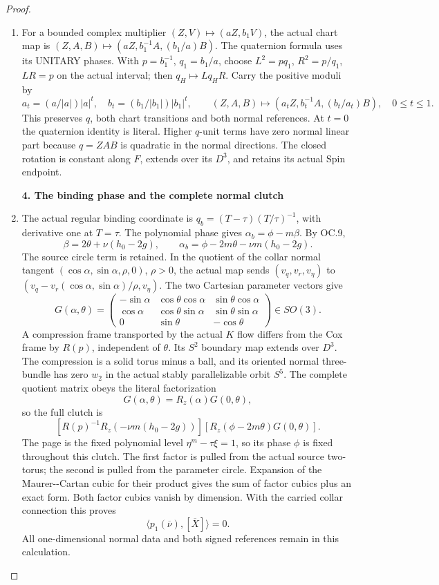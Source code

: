 \begin{proof}
\begin{enumerate}[label=\arabic*.]
\item For a bounded complex multiplier \((Z,V)\mapsto(aZ,b_1V)\), the
actual chart map is
\((Z,A,B)\mapsto(aZ,b_1^{-1}A,(b_1/a)B)\). The quaternion formula
uses its UNITARY phases. With \(p=b_1^{-1}\), \(q_1=b_1/a\), choose
\(L^2=pq_1\), \(R^2=p/q_1\), \(LR=p\) on the actual interval;
then \(q_H\mapsto Lq_HR\). Carry the positive moduli by
\[
a_t=(a/|a|)|a|^t,\quad b_t=(b_1/|b_1|)|b_1|^t,\qquad
(Z,A,B)\mapsto(a_tZ,b_t^{-1}A,(b_t/a_t)B),\quad0\le t\le1.
\tag{OC.15}
\]
This preserves \(q\), both chart transitions and both normal
references. At \(t=0\) the quaternion identity is literal. Higher
\(q\)-unit terms have zero normal linear part because \(q=ZAB\)
is quadratic in the normal directions. The closed rotation is
constant along \(F\), extends over its \(D^3\), and retains its
actual Spin endpoint.

\par

\medskip\noindent\textbf{4. The binding phase and the complete normal clutch}

\par\nobreak

\item The actual regular binding coordinate is
\(q_b=(T-\tau)(T/\tau)^{-1}\), with derivative one at \(T=\tau\).
The polynomial phase gives \(\alpha_b=\phi-m\beta\). By OC.9,
\[
\beta=2\theta+\nu(h_0-2g),\qquad
\alpha_b=\phi-2m\theta-\nu m(h_0-2g).
\tag{OC.16}
\]
The source circle term is retained. In the quotient of the collar
normal tangent \((\cos\alpha,\sin\alpha,\rho,0)\), \(\rho>0\),
the actual map sends
\((v_q,v_r,v_\eta)\) to
\((v_q-v_r(\cos\alpha,\sin\alpha)/\rho,v_\eta)\).
The two Cartesian parameter vectors give
\[
G(\alpha,\theta)=\begin{pmatrix}
-\sin\alpha&\cos\theta\cos\alpha&\sin\theta\cos\alpha\\
\cos\alpha&\cos\theta\sin\alpha&\sin\theta\sin\alpha\\
0&\sin\theta&-\cos\theta
\end{pmatrix}\in SO(3).
\tag{OC.17}
\]
A compression frame transported by the actual \(K\) flow differs
from the Cox frame by \(R(p)\), independent of \(\theta\). Its
\(S^2\) boundary map extends over \(D^3\). The compression is a
solid torus minus a ball, and its oriented normal three-bundle has
zero \(w_2\) in the actual stably parallelizable orbit \(S^5\).
The complete quotient matrix obeys the literal factorization
\[
G(\alpha,\theta)=R_z(\alpha)G(0,\theta),
\tag{OC.18}
\]
so the full clutch is
\[
[R(p)^{-1}R_z(-\nu m(h_0-2g))]
[R_z(\phi-2m\theta)G(0,\theta)].
\tag{OC.19}
\]
The page is the fixed polynomial level \(\eta^m-\tau\xi=1\), so its phase \(\phi\) is fixed throughout this clutch. The first factor is pulled from the actual source two-torus; the
second is pulled from the parameter circle. Expansion of the
Maurer-\/-Cartan cubic for their product gives the sum of factor
cubics plus an exact form. Both factor cubics vanish by dimension.
With the carried collar connection this proves
\[
\langle p_1(\overline\nu),[\overline X]\rangle=0.
\tag{OC.20}
\]
All one-dimensional normal data and both signed references remain
in this calculation.


\end{enumerate}
\end{proof}
